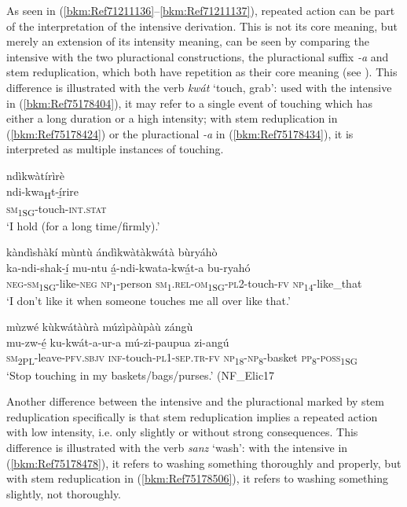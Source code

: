 As seen in (\ref{bkm:Ref71211136}--\ref{bkm:Ref71211137}), repeated action can be part of the interpretation of the intensive derivation. This is not its core meaning, but merely an extension of its intensity meaning, can be seen by comparing the intensive with the two pluractional constructions, the pluractional suffix \textit{-a} and stem reduplication, which both have repetition as their core meaning (see ). This difference is illustrated with the verb \textit{kwát} ‘touch, grab’: used with the intensive in (\ref{bkm:Ref75178404}), it may refer to a single event of touching which has either a long duration or a high intensity; with stem reduplication in (\ref{bkm:Ref75178424}) or the pluractional \textit{-a} in (\ref{bkm:Ref75178434}), it is interpreted as multiple instances of touching.

\ea
\label{bkm:Ref75178404}
\glll ndìkwàtírìrè\\
ndi-kwa\textsubscript{H}t-í̲rire\\
\textsc{sm}\textsubscript{1SG}-touch-\textsc{int}.\textsc{stat}\\
\glt ‘I hold (for a long time/firmly).’
\z

\ea
\label{bkm:Ref75178424}
kàndìshàkí mùntù ándìkwàtàkwátà bùryáhò\\
\gll ka-ndi-shak-í̲    mu-ntu  á̲-ndi-kwata-kwá̲t-a    bu-ryahó \\
\textsc{neg}-\textsc{sm}\textsubscript{1SG}-like-\textsc{neg}  \textsc{np}\textsubscript{1}-person
\textsc{sm}\textsubscript{1}.\textsc{rel}-\textsc{om}\textsubscript{1SG}-\textsc{pl}2-touch-\textsc{fv}  \textsc{np}\textsubscript{14}-like\_that\\
\glt ‘I don’t like it when someone touches me all over like that.’
\z

\ea
\label{bkm:Ref75178434}
mùzwé kùkwátàùrà múzìpàùpàù zángù\\
\gll mu-zw-é̲      ku-kwát-a-ur-a mú-zi-paupua  zi-angú\\
\textsc{sm}\textsubscript{2PL}-leave-\textsc{pfv}.\textsc{sbjv}  \textsc{inf}-touch-\textsc{pl}1-\textsc{sep}.\textsc{tr}-\textsc{fv}
\textsc{np}\textsubscript{18}-\textsc{np}\textsubscript{8}-basket  \textsc{pp}\textsubscript{8}-\textsc{poss}\textsubscript{1SG}\\
\glt ‘Stop touching in my baskets/bags/purses.’ (NF\_Elic17
\z

Another difference between the intensive and the pluractional marked by stem reduplication specifically is that stem reduplication implies a repeated action with low intensity, i.e. only slightly or without strong consequences. This difference is illustrated with the verb \textit{sanz} ‘wash’: with the intensive in (\ref{bkm:Ref75178478}), it refers to washing something thoroughly and properly, but with stem reduplication in (\ref{bkm:Ref75178506}), it refers to washing something slightly, not thoroughly.

